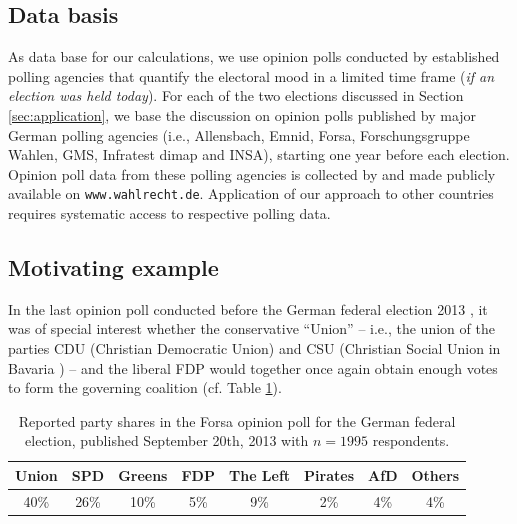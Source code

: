 \documentclass[smallextended]{svjour3}      %
\begin{document}
\subsection{Data basis}\label{ssec:data-basis}
As data base for our calculations, we use opinion polls conducted by established
polling agencies that quantify the electoral mood in a limited time frame
(\textit{if an election was held today}). For each of the two elections discussed
in Section \ref{sec:application}, we base the discussion on opinion polls published
by major German polling agencies (i.e., Allensbach, Emnid, Forsa, Forschungsgruppe Wahlen,
GMS, Infratest dimap and INSA), starting one year before each election.
Opinion poll data from these polling agencies is collected by and made publicly available
on \texttt{www.wahlrecht.de}. Application of our approach to other countries
requires systematic access to respective polling data.


\subsection{Motivating example}\label{ssec:intro-ex-fdp}
In the last opinion poll conducted before the German federal election 2013 \citep{forsa_2013},
it was of special interest whether the conservative ``Union'' -- i.e., the union of
the parties CDU (Christian Democratic Union) and CSU (Christian Social Union in Bavaria ) --
and the liberal FDP would together once again obtain enough votes to form the
governing coalition (cf. Table \ref{tab_fdp}).

\begin{table}[!ht]\centering
\caption{Reported party shares in the Forsa opinion poll for the German federal
election, published September 20th, 2013 with $n=1995$ respondents.
\label{tab_fdp}
}
\medskip
\begin{tabular}{cccccccc}
\toprule[0.09 em]
Union & SPD & Greens & FDP & The Left & Pirates & AfD & Others \\
\midrule
40\% & 26\% & 10\% & 5\% & 9\% & 2\% & 4\% & 4\% \\
\bottomrule[0.09 em]
\end{tabular}
\end{table}
\end{document}
